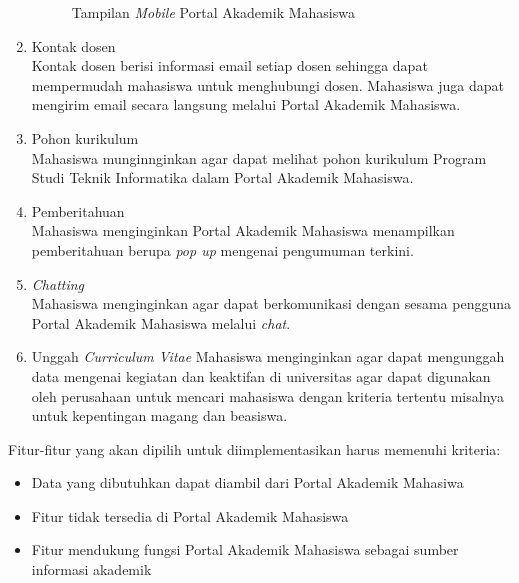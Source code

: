 \begin{enumerate}
\begin{figure}[H]
			\caption{Tampilan \textit{Mobile} Portal Akademik Mahasiswa} 
			\label{fig:3_pam_mobile}
		\end{figure}
	\item Kontak dosen\\
	Kontak dosen berisi informasi email setiap dosen sehingga dapat mempermudah mahasiswa untuk menghubungi dosen. Mahasiswa juga dapat mengirim email secara langsung melalui Portal Akademik Mahasiswa.
	\item Pohon kurikulum\\
	Mahasiswa munginnginkan agar dapat melihat pohon kurikulum Program Studi Teknik Informatika dalam Portal Akademik Mahasiswa.
	\item Pemberitahuan\\
	Mahasiswa menginginkan Portal Akademik Mahasiswa menampilkan pemberitahuan berupa \textit{pop up} mengenai pengumuman terkini.
	\item \textit{Chatting}\\
	Mahasiswa menginginkan agar dapat berkomunikasi dengan sesama pengguna Portal Akademik Mahasiswa melalui \textit{chat}.
	\item Unggah \textit{Curriculum Vitae}
	Mahasiswa menginginkan agar dapat mengunggah data mengenai kegiatan dan keaktifan di universitas agar dapat digunakan oleh perusahaan untuk mencari mahasiswa dengan kriteria tertentu misalnya untuk kepentingan magang dan beasiswa.
\end{enumerate}

Fitur-fitur yang akan dipilih untuk diimplementasikan harus memenuhi kriteria:
\begin{itemize}
	\item Data yang dibutuhkan dapat diambil dari Portal Akademik Mahasiwa
	\item Fitur tidak tersedia di Portal Akademik Mahasiswa
	\item Fitur mendukung fungsi Portal Akademik Mahasiswa sebagai sumber informasi akademik
\end{itemize}

